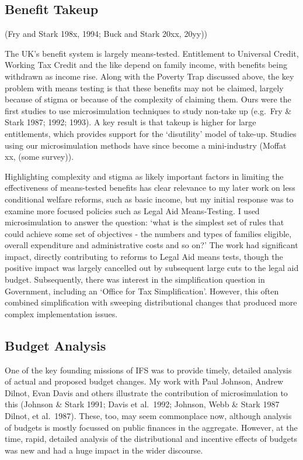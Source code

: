 \documentclass[
  letterpaper,
  DIV=11,
  numbers=noendperiod]{scrartcl}
\begin{document}
\subsection{Benefit Takeup}\label{benefit-takeup}

(Fry and Stark 198x, 1994; Buck and Stark 20xx, 20yy))

The UK's benefit system is largely means-tested. Entitlement to
Universal Credit, Working Tax Credit and the like depend on family
income, with benefits being withdrawn as income rise. Along with the
Poverty Trap discussed above, the key problem with means testing is that
these benefits may not be claimed, largely because of stigma or because
of the complexity of claiming them. Ours were the first studies to use
microsimulation techniques to study non-take up (e.g.~Fry \& Stark 1987;
1992; 1993). A key result is that takeup is higher for large
entitlements, which provides support for the `disutility' model of
take-up. Studies using our microsimulation methods have since become a
mini-industry (Moffat xx, (some survey)).

Highlighting complexity and stigma as likely important factors in
limiting the effectiveness of means-tested benefits has clear relevance
to my later work on less conditional welfare reforms, such as basic
income, but my initial response was to examine more focused policies
such as Legal Aid Means-Testing. I used microsimulation to answer the
question: `what is the simplest set of rules that could achieve some set
of objectives - the numbers and types of families eligible, overall
expenditure and administrative costs and so on?' The work had
significant impact, directly contributing to reforms to Legal Aid means
tests, though the positive impact was largely cancelled out by
subsequent large cuts to the legal aid budget. Subsequently, there was
interest in the simplification question in Government, including an
`Office for Tax Simplification'. However, this often combined
simplification with sweeping distributional changes that produced more
complex implementation issues.

\subsection{Budget Analysis}\label{budget-analysis}

One of the key founding missions of IFS was to provide timely, detailed
analysis of actual and proposed budget changes. My work with Paul
Johnson, Andrew Dilnot, Evan Davis and others illustrate the
contribution of microsimulation to this (Johnson \& Stark 1991; Davis et
al.~1992; Johnson, Webb \& Stark 1987 Dilnot, et al.~1987). These, too,
may seem commonplace now, although analysis of budgets is mostly
focussed on public finances in the aggregate. However, at the time,
rapid, detailed analysis of the distributional and incentive effects of
budgets was new and had a huge impact in the wider discourse.
\end{document}
